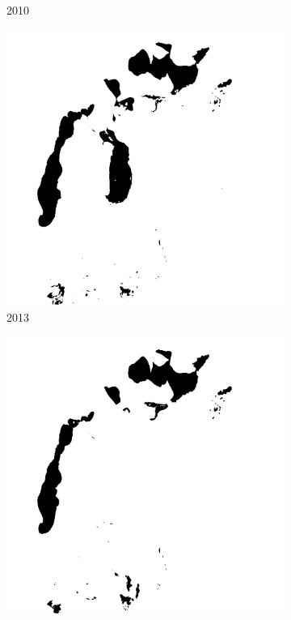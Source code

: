 \documentclass[12pt,a4paper]{article}
\begin{document}
\begin{figure}[H]
\begin{subfigure}[b]{0.19\textwidth}
        \caption{2010}
    \end{subfigure}
    \begin{subfigure}[b]{0.19\textwidth}
        \centering
        \includegraphics[width=\textwidth]{../img/2013w.jpg}
        \caption{2013}
    \end{subfigure}
    \begin{subfigure}[b]{0.19\textwidth}
        \centering
        \includegraphics[width=\textwidth]{../img/2014w.jpg}

\end{subfigure}
\end{figure}
\end{document}
